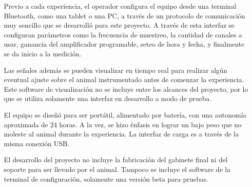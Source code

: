Previo a cada experiencia, el operador configura el equipo desde una terminal Bluetooth, como una tablet o una PC, a través de un protocolo de comunicación muy sencillo que se desarrolló para este proyecto. A través de esta interfaz se configuran parámetros como la frecuencia de muestreo, la cantidad de canales a usar, ganancia del amplificador programable, seteo de hora y fecha, y finalmente se da inicio a la medición. 

Las señales además se pueden visualizar en tiempo real para realizar algún eventual ajuste sobre el animal instrumentado antes de comenzar la experiencia. Este software de visualización no se incluye entre los alcances del proyecto, por lo que se utiliza solamente una interfaz en desarrollo a modo de prueba. 

El equipo se diseñó para ser portátil, alimentado por batería, con una autonomía aproximada de 24 horas. A la vez, se hizo énfasis en lograr un bajo peso que no moleste al animal durante la experiencia. La interfaz de carga es a través de la misma conexión USB.

El desarrollo del proyecto no incluye la fabricación del gabinete final ni del soporte para ser llevado por el animal. Tampoco se incluye el software de la terminal de configuración, solamente una versión beta para pruebas.






